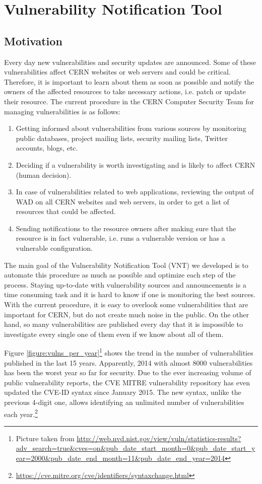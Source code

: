 \chapter{Vulnerability Notification Tool}
\label{vulnerability-notification-tool}
\thispagestyle{empty}

\section{Motivation}
Every day new vulnerabilities and security updates are announced. Some of these vulnerabilities affect CERN websites or web servers and could be critical. Therefore, it is important to learn about them as soon as possible and notify the owners of the affected resources to take necessary actions, i.e. patch or update their resource. The current procedure in the CERN Computer Security Team for managing vulnerabilities is as follows:
\begin{enumerate}
\item Getting informed about vulnerabilities from various sources by monitoring public databases, project mailing lists, security mailing lists, Twitter accounts, blogs, etc.
\item Deciding if a vulnerability is worth investigating and is likely to affect CERN (human decision).
\item In case of vulnerabilities related to web applications, reviewing the output of WAD on all CERN websites and web servers, in order to get a list of resources that could be affected.
\item Sending notifications to the resource owners after making sure that the resource is in fact vulnerable, i.e. runs a vulnerable version or has a vulnerable configuration.
\end{enumerate}

The main goal of the Vulnerability Notification Tool (VNT) we developed is to automate this procedure as much as possible and optimize each step of the process. Staying up-to-date with vulnerability sources and announcements is a time consuming task and it is hard to know if one is monitoring the best sources. With the current procedure, it is easy to overlook some vulnerabilities that are important for CERN, but do not create much noise in the public. 
On the other hand, so many vulnerabilities are published every day that it is impossible to investigate every single one of them even if we know about all of them.

Figure \ref{figure:vulns_per_year}\footnote{Picture taken from \url{http://web.nvd.nist.gov/view/vuln/statistics-results?adv_search=true&cves=on&pub_date_start_month=0&pub_date_start_year=2000&pub_date_end_month=11&pub_date_end_year=2014}} shows the trend in the number of vulnerabilities published in the last 15 years. Apparently, 2014 with almost 8000 vulnerabilities has been the worst year so far for security. Due to the ever increasing volume of public vulnerability reports, the CVE MITRE vulnerability repository has even updated the CVE-ID syntax since January 2015. The new syntax, unlike the previous 4-digit one, allows identifying an unlimited number of vulnerabilities each year.\footnote{\url {https://cve.mitre.org/cve/identifiers/syntaxchange.html}} 
